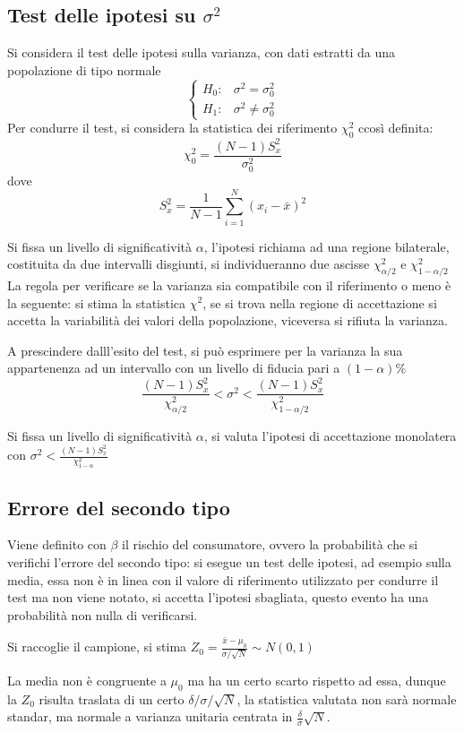 
\subsection{Test delle ipotesi su $\sigma^2$}
Si considera il test delle ipotesi sulla varianza, con dati estratti da una popolazione di tipo normale
$$
\begin{cases}
    H_0: & \sigma^2 = \sigma^2_0\\
    H_1: & \sigma^2 \neq \sigma^2_0
\end{cases}
$$
Per condurre il test, si considera la statistica dei riferimento $\chi_0^2$ ccosì definita:
$$
\chi_0^2 = \frac{(N-1)S^2_x}{\sigma_0^2}
$$
dove
$$
S^2_x = \frac{1}{N-1}\sum_{i=1}^{N} (x_i - \bar{x})^2
$$

Si fissa un livello di significatività $\alpha$, l'ipotesi richiama ad una 
regione bilaterale, costituita da due intervalli disgiunti, si individueranno 
due ascisse $\chi^2_{\alpha/2}$ e $\chi^2_{1-\alpha/2} $
La regola per verificare se la varianza sia compatibile con il riferimento o meno è la seguente: si stima la statistica $\chi^2$, se si trova nella regione di accettazione si accetta la variabilità dei valori della popolazione, viceversa si rifiuta la varianza.

A prescindere dalll'esito del test, si può esprimere per la varianza la sua appartenenza ad un intervallo con un livello di fiducia pari a $(1-\alpha)\%$ 
$$
\frac{(N-1)S^2_x}{\chi_{\alpha/2}^2} < \sigma^2 < \frac{(N-1)S^2_x}{\chi_{1-\alpha/2}^2}
$$

Si fissa un livello di significatività $\alpha$, si valuta l'ipotesi di accettazione monolatera con $\sigma^2 < \frac{(N-1)S^2_x}{\chi^2_{1-\alpha}}$

\subsection{Errore del secondo tipo}
Viene definito con $\beta$ il rischio del consumatore, ovvero la probabilità 
che si verifichi l'errore del secondo tipo: si esegue un test delle ipotesi, ad 
esempio sulla media, essa non è in linea con il valore di riferimento 
utilizzato per condurre il test ma non viene notato, si accetta l'ipotesi 
sbagliata, questo evento ha una probabilità non nulla di verificarsi.

Si raccoglie il campione, si stima $Z_0 = \frac{\bar{x}-\mu_0}{\sigma/\sqrt{N}}\sim N(0,1)$

La media non è congruente a $\mu_0$ ma ha un certo scarto rispetto ad essa, dunque la $Z_0$ risulta traslata di un certo $\delta/\sigma/\sqrt{N}$, la statistica valutata non sarà normale standar, ma normale a varianza unitaria centrata in $\frac{\delta}{\sigma}\sqrt{N}$.

